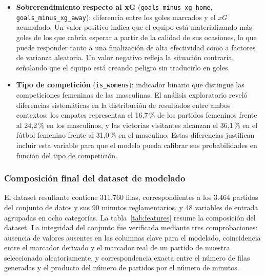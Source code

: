 \begin{itemize}
    \item \textbf{Sobrerendimiento respecto al xG} (\texttt{goals\_minus\_xg\_home}, \texttt{goals\_minus\_xg\_away}): diferencia entre los goles marcados y el \textit{xG} acumulado. Un valor positivo indica que el equipo está materializando más goles de los que cabría esperar a partir de la calidad de sus ocasiones, lo que puede responder tanto a una finalización de alta efectividad como a factores de varianza aleatoria. Un valor negativo refleja la situación contraria, señalando que el equipo está creando peligro sin traducirlo en goles.

    \item \textbf{Tipo de competición} (\texttt{is\_womens}): indicador binario que distingue las competiciones femeninas de las masculinas. El análisis exploratorio reveló diferencias sistemáticas en la distribución de resultados entre ambos contextos: los empates representan el 16,7\,\% de los partidos femeninos frente al 24,2\,\% en los masculinos, y las victorias visitantes alcanzan el 36,1\,\% en el fútbol femenino frente al 31,0\,\% en el masculino. Estas diferencias justifican incluir esta variable para que el modelo pueda calibrar sus probabilidades en función del tipo de competición.
\end{itemize}

\subsubsection{Composición final del dataset de modelado}

El dataset resultante contiene 311.760 filas, correspondientes a los 3.464 partidos del conjunto de datos y sus 90 minutos reglamentarios, y 48 variables de entrada agrupadas en ocho categorías. La tabla~\ref{tab:features} resume la composición del dataset. La integridad del conjunto fue verificada mediante tres comprobaciones: ausencia de valores ausentes en las columnas clave para el modelado, coincidencia entre el marcador derivado y el marcador real de un partido de muestra seleccionado aleatoriamente, y correspondencia exacta entre el número de filas generadas y el producto del número de partidos por el número de minutos.

